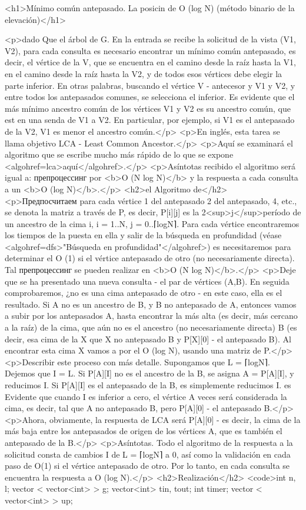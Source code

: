 <h1>Mínimo común antepasado. La posicin de O (log N) (método binario de la elevación)</h1>

<p>dado Que el árbol de G. En la entrada se recibe la solicitud de la vista (V1, V2), para cada consulta es necesario encontrar un mínimo común antepasado, es decir, el vértice de la V, que se encuentra en el camino desde la raíz hasta la V1, en el camino desde la raíz hasta la V2, y de todos esos vértices debe elegir la parte inferior. En otras palabras, buscando el vértice V - antecesor y V1 y V2, y entre todos los antepasados comunes, se selecciona el inferior. Es evidente que el más mínimo ancestro común de los vértices V1 y V2 es su ancestro común, que est en una senda de V1 a V2. En particular, por ejemplo, si V1 es el antepasado de la V2, V1 es menor el ancestro común.</p>
<p>En inglés, esta tarea se llama objetivo LCA - Least Common Ancestor.</p>
<p>Aquí se examinará el algoritmo que se escribe mucho más rápido de lo que se expone <algohref=lca>aquí</algohref>.</p>
<p>Asíntotas recibido el algoritmo será igual a: препроцессинг por <b>O (N log N)</b> y la respuesta a cada consulta a un <b>O (log N)</b>.</p>
<h2>el Algoritmo de</h2>
<p>Предпосчитаем para cada vértice 1 del antepasado 2 del antepasado, 4, etc., se denota la matriz a través de P, es decir, P[i][j] es la 2<sup>j</sup>período de un ancestro de la cima i, i = 1..N, j = 0..⌈logN⌉. Para cada vértice encontraremos los tiempos de la puesta en ella y salir de la búsqueda en profundidad (véase <algohref=dfs>"Búsqueda en profundidad"</algohref>) es necesitaremos para determinar el O (1) si el vértice antepasado de otro (no necesariamente directa). Tal препроцессинг se pueden realizar en <b>O (N log N)</b>.</p>
<p>Deje que se ha presentado una nueva consulta - el par de vértices (A,B). En seguida comprobaremos, ¿no es una cima antepasado de otro - en este caso, ella es el resultado. Si A no es un ancestro de B, y B no antepasado de A, entonces vamos a subir por los antepasados A, hasta encontrar la más alta (es decir, más cercano a la raíz) de la cima, que aún no es el ancestro (no necesariamente directa) B (es decir, esa cima de la X que X no antepasado B y P[X][0] - el antepasado B). Al encontrar esta cima X vamos a por el O (log N), usando una matriz de P.</p>
<p>Describir este proceso con más detalle. Supongamos que L = ⌈logN⌉. Dejemos que I = L. Si P[A][I] no es el ancestro de la B, se asigna A = P[A][I], y reducimos I. Si P[A][I] es el antepasado de la B, es simplemente reducimos I. es Evidente que cuando I es inferior a cero, el vértice A veces será considerada la cima, es decir, tal que A no antepasado B, pero P[A][0] - el antepasado B.</p>
<p>Ahora, obviamente, la respuesta de LCA será P[A][0] - es decir, la cima de la más baja entre los antepasados de origen de los vértices A, que es también el antepasado de la B.</p>
<p>Asíntotas. Todo el algoritmo de la respuesta a la solicitud consta de cambios I de L = ⌈logN⌉ a 0, así como la validación en cada paso de O(1) si el vértice antepasado de otro. Por lo tanto, en cada consulta se encuentra la respuesta a O (log N).</p>
<h2>Realización</h2>
<code>int n, l;
vector < vector<int> > g;
vector<int> tin, tout;
int timer;
vector < vector<int> > up;

